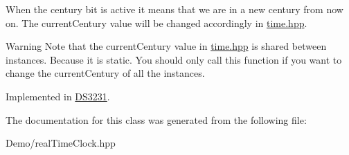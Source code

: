 When the century bit is active it means that we are in a new century from now on. The current\+Century value will be changed accordingly in \mbox{\hyperlink{time_8hpp_source}{time.\+hpp}}. \begin{DoxyWarning}{Warning}
Note that the current\+Century value in \mbox{\hyperlink{time_8hpp_source}{time.\+hpp}} is shared between instances. Because it is static. You should only call this function if you want to change the current\+Century of all the instances. 
\end{DoxyWarning}


Implemented in \mbox{\hyperlink{class_d_s3231_a143ec57122d892ea0ec671a153352f2c}{D\+S3231}}.



The documentation for this class was generated from the following file\+:\begin{DoxyCompactItemize}
\item 
Demo/real\+Time\+Clock.\+hpp\end{DoxyCompactItemize}
